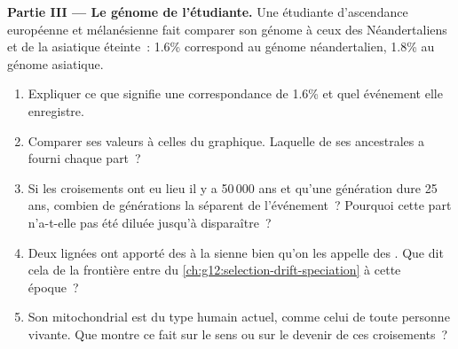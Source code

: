 \begin{problem}
\medskip
\noindent\textbf{Partie III --- Le génome de l'étudiante.}
Une étudiante d'ascendance européenne et mélanésienne fait comparer
son génome à ceux des Néandertaliens et de la  asiatique
éteinte~: 1.6\% correspond au génome néandertalien, 1.8\% au génome
asiatique.
\begin{enumerate}[resume]
  \item Expliquer ce que signifie une correspondance de 1.6\% et quel
        événement elle enregistre.
  \item Comparer ses valeurs à celles du graphique. Laquelle de ses
         ancestrales a fourni chaque part~?
  \item Si les croisements ont eu lieu il y a 50\,000 ans et qu'une
        génération dure 25 ans, combien de générations la séparent de
        l'événement~? Pourquoi cette part n'a-t-elle pas été diluée
        jusqu'à disparaître~?
  \item Deux lignées ont apporté des  à la sienne bien qu'on les
        appelle des . Que dit cela de la frontière entre
         du \cref{ch:g12:selection-drift-speciation} à cette
        époque~?
  \item Son  mitochondrial est du type humain actuel, comme celui
        de toute personne vivante. Que montre ce fait sur le sens ou
        sur le devenir de ces croisements~?
\end{enumerate}


\end{problem}
